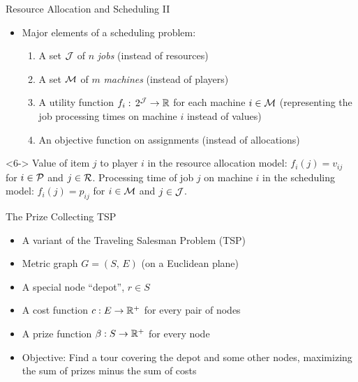 \documentclass[10pt]{beamer}
\begin{document}
\begin{frame}{Resource Allocation and Scheduling II}
\begin{itemize}
	\item<1-> 	Major elements of a scheduling problem:
	\begin{enumerate}
		\item<2-> A set $\mathcal{J}$ of $n$ \emph{jobs} (instead of resources)
		\item<3-> A set $\mathcal{M}$ of $m$ \emph{machines} (instead of players)
		\item<4-> A utility function $f_{i}: \, 2^{\mathcal{J}} \rightarrow \mathbb{R}$ for each machine $i \in \mathcal{M}$ (representing the job processing times on machine $i$ instead of values)
		\item<5-> An objective function on \alert{assignments} (instead of allocations)
	\end{enumerate}	
\end{itemize}
\begin{example}<6->
Value of item $j$ to player $i$ in the resource allocation model: $f_{i}(j) = v_{ij}$ for $i \in \mathcal{P}$ and $j \in \mathcal{R}$. Processing time of job $j$ on machine $i$ in the scheduling model: $f_{i}(j) = p_{ij}$ for $i \in \mathcal{M}$ and $j \in \mathcal{J}$.
\end{example}
\end{frame}


\begin{frame}[fragile]{The Prize Collecting TSP}

\begin{itemize}
\item<1-> A variant of the Traveling Salesman Problem (TSP)
\item<2-> Metric graph $G = (S, \, E)$ (on a Euclidean plane) 
\item<3-> A special node ``depot'', $r \in S$
\item<4-> A cost function $c:E \rightarrow \mathbb{R}^+$ for every pair of nodes
\item<5-> A prize function $\beta:S \rightarrow \mathbb{R}^+$ for every node
\item<6-> \alert{Objective:} Find a tour covering the depot and \alert{some} other nodes, maximizing the sum of prizes minus the sum of costs


\end{itemize}
\end{frame}
\end{document}
